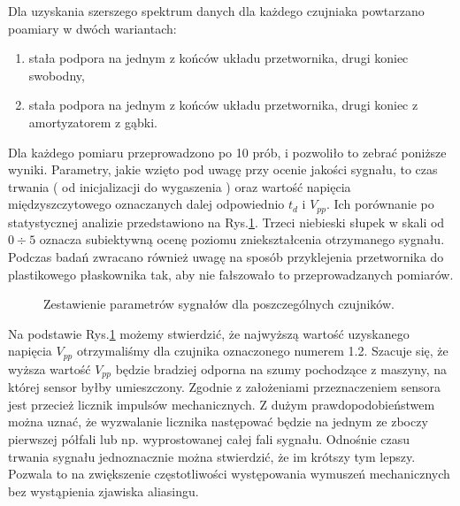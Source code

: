 Dla uzyskania szerszego spektrum danych dla każdego czujniaka powtarzano poamiary w dwóch wariantach: 
\begin{enumerate}
\item stała podpora na jednym z końców układu przetwornika, drugi koniec swobodny,
\item stała podpora na jednym z końców układu przetwornika, drugi koniec z amortyzatorem z gąbki.
\end{enumerate}
Dla każdego pomiaru przeprowadzono po 10 prób, i pozwoliło to zebrać poniższe wyniki. Parametry, jakie wzięto pod uwagę przy ocenie jakości sygnału, to czas trwania ( od inicjalizacji do wygaszenia ) oraz wartość napięcia międzyszczytowego oznaczanych dalej odpowiednio $t_d$ i $V_{pp}$. Ich porównanie po statystycznej analizie przedstawiono na Rys.\ref{fig:sensor_sel_geometry}. Trzeci niebieski słupek w skali od $0\div5$ oznacza subiektywną ocenę poziomu zniekształcenia otrzymanego sygnału. Podczas badań zwracano również uwagę na sposób przyklejenia przetwornika do plastikowego płaskownika tak, aby nie fałszowało to przeprowadzanych pomiarów. 

\begin{figure}[htbp]
\centering
{}%
\caption{Zestawienie parametrów sygnałów dla poszczególnych czujników.}
\label{fig:sensor_sel_geometry}
\end{figure}

Na podstawie Rys.\ref{fig:sensor_sel_geometry} możemy stwierdzić, że najwyższą wartość uzyskanego napięcia $V_{pp}$ otrzymaliśmy dla czujnika oznaczonego numerem 1.2. Szacuje się, że wyższa wartość $V_{pp}$ będzie bradziej odporna na szumy pochodzące z maszyny, na której sensor byłby umieszczony. Zgodnie z założeniami przeznaczeniem sensora jest przecież licznik impulsów mechanicznych. Z dużym prawdopodobieństwem można uznać, że wyzwalanie licznika następować będzie na jednym ze zboczy pierwszej półfali lub np. wyprostowanej całej fali sygnału. 
\ident Odnośnie czasu trwania sygnału jednoznacznie można stwierdzić, że im krótszy tym lepszy. Pozwala to na zwiększenie częstotliwości występowania wymuszeń mechanicznych bez wystąpienia zjawiska aliasingu.



